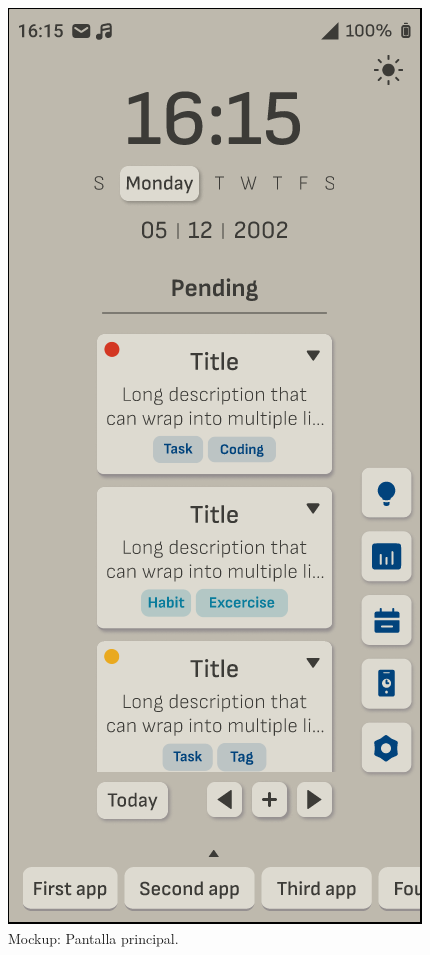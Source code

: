 \begin{figure}[H]
  \centering
  \begin{minipage}{0.48\textwidth}
    \caption{Mockup: Pantalla principal.}
    \label{fig:mockup_pantalla_principal}
    \includegraphics[width=\textwidth]{Figuras/mockup_1.png}

\end{minipage}
\end{figure}
